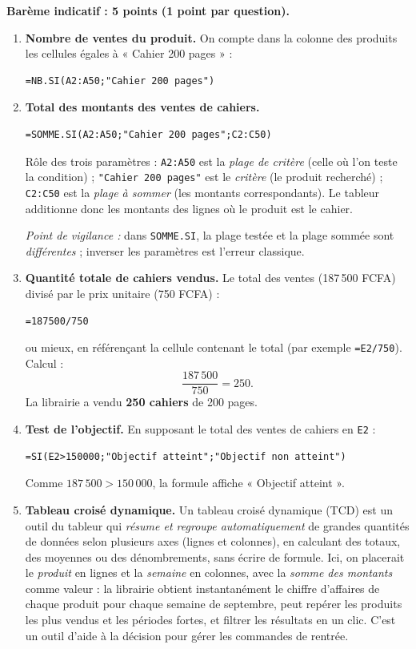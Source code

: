 \documentclass[11pt]{article}
\begin{document}
\begin{corrige}\tcblower
\textbf{Barème indicatif : 5 points (1 point par question).}

\begin{enumerate}
\item \textbf{Nombre de ventes du produit.} On compte dans la colonne des produits les cellules égales à « Cahier 200 pages » :
\begin{lstlisting}
=NB.SI(A2:A50;"Cahier 200 pages")
\end{lstlisting}

\item \textbf{Total des montants des ventes de cahiers.}
\begin{lstlisting}
=SOMME.SI(A2:A50;"Cahier 200 pages";C2:C50)
\end{lstlisting}
Rôle des trois paramètres : \texttt{A2:A50} est la \emph{plage de critère} (celle où l'on teste la condition) ; \texttt{"Cahier 200 pages"} est le \emph{critère} (le produit recherché) ; \texttt{C2:C50} est la \emph{plage à sommer} (les montants correspondants). Le tableur additionne donc les montants des lignes où le produit est le cahier.

\emph{Point de vigilance :} dans \texttt{SOMME.SI}, la plage testée et la plage sommée sont \emph{différentes} ; inverser les paramètres est l'erreur classique.

\item \textbf{Quantité totale de cahiers vendus.} Le total des ventes (187\,500 FCFA) divisé par le prix unitaire (750 FCFA) :
\begin{lstlisting}
=187500/750
\end{lstlisting}
ou mieux, en référençant la cellule contenant le total (par exemple \texttt{=E2/750}). Calcul :
\[ \frac{187\,500}{750} = 250. \]
La librairie a vendu \textbf{250 cahiers} de 200 pages.

\item \textbf{Test de l'objectif.} En supposant le total des ventes de cahiers en \texttt{E2} :
\begin{lstlisting}
=SI(E2>150000;"Objectif atteint";"Objectif non atteint")
\end{lstlisting}
Comme $187\,500 > 150\,000$, la formule affiche « Objectif atteint ».

\item \textbf{Tableau croisé dynamique.} Un tableau croisé dynamique (TCD) est un outil du tableur qui \emph{résume et regroupe automatiquement} de grandes quantités de données selon plusieurs axes (lignes et colonnes), en calculant des totaux, des moyennes ou des dénombrements, sans écrire de formule. Ici, on placerait le \emph{produit} en lignes et la \emph{semaine} en colonnes, avec la \emph{somme des montants} comme valeur : la librairie obtient instantanément le chiffre d'affaires de chaque produit pour chaque semaine de septembre, peut repérer les produits les plus vendus et les périodes fortes, et filtrer les résultats en un clic. C'est un outil d'aide à la décision pour gérer les commandes de rentrée.
\end{enumerate}
\end{corrige}
\end{document}
